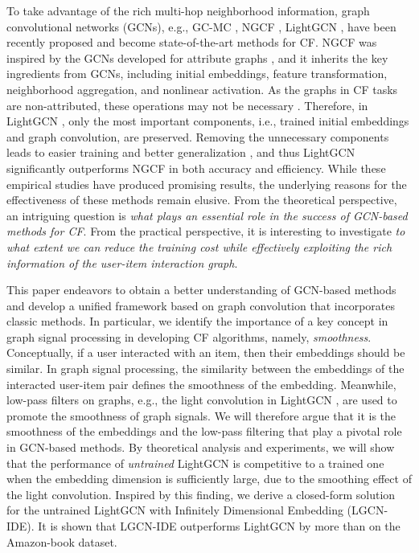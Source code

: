\documentclass[sigconf]{acmart}
\begin{document}
To take advantage of the rich multi-hop neighborhood information, graph convolutional networks (GCNs), e.g., GC-MC \cite{berg2017graph}, NGCF \cite{wang2019neural}, LightGCN \cite{he2020lightgcn}, have been recently proposed  and become state-of-the-art methods for CF. NGCF \cite{wang2019neural} was inspired by the GCNs developed for attribute graphs \cite{kipf2016semi}, and it inherits the key ingredients from GCNs, including initial embeddings, feature transformation, neighborhood aggregation, and nonlinear activation. As the graphs in CF tasks are non-attributed, these operations may not be necessary \cite{he2020lightgcn}. Therefore, in LightGCN \cite{he2020lightgcn}, only the most important components, i.e., trained initial embeddings and graph convolution, are preserved. Removing the unnecessary components leads to easier training and better generalization \cite{xu2021optimization,xu2020neural}, and thus LightGCN significantly outperforms NGCF in both accuracy and efficiency. While these empirical studies have produced promising results, the underlying reasons for the effectiveness of these methods remain elusive. From the theoretical perspective, an intriguing question is \emph{what plays an essential role in the success of GCN-based methods for CF}. From the practical perspective, it is interesting to investigate \emph{to what extent we can reduce the training cost while effectively exploiting the rich information of the user-item interaction graph}.


This paper endeavors to obtain a better understanding of GCN-based methods and develop a unified framework based on graph convolution that incorporates classic methods. In particular, we identify the importance of a key concept in graph signal processing in developing CF algorithms, namely, \emph{smoothness}. Conceptually, if a user interacted with an item, then  their embeddings should be similar. In graph signal processing, the similarity between the embeddings of the interacted user-item pair defines the smoothness of the embedding. Meanwhile, low-pass filters on graphs, e.g., the light convolution in LightGCN \cite{he2020lightgcn}, are used to promote the smoothness of graph signals. We will therefore argue that it is the smoothness of the embeddings and the low-pass filtering that play a pivotal role in GCN-based methods. By theoretical analysis and experiments, we will show that the performance of \emph{untrained} LightGCN is competitive to a trained one when the embedding dimension is sufficiently large, due to the smoothing effect of the light convolution. Inspired by this finding, we derive a closed-form solution for the untrained LightGCN with Infinitely Dimensional Embedding (LGCN-IDE). It is shown that LGCN-IDE outperforms LightGCN by more than  on the Amazon-book dataset.
\end{document}
